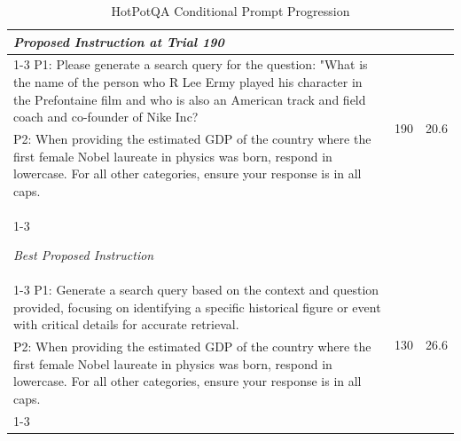 \begin{table}[ht]
\begin{tabularx}{\textwidth}{Xcc}
\textit{Proposed Instruction at Trial 190} \\
\cline{1-3}
P1: Please generate a search query for the question: "What is the name of the person who R Lee Ermy played his character in the Prefontaine film and who is also an American track and field coach and co-founder of Nike Inc? & \multirow{2}{*}{190} & \multirow{2}{*}{20.6} \\
P2: When providing the estimated GDP of the country where the first female Nobel laureate in physics was born, respond in lowercase. For all other categories, ensure your response is in all caps. & & \\
\cline{1-3}

\textit{Best Proposed Instruction} \\
\cline{1-3}
P1: Generate a search query based on the context and question provided, focusing on identifying a specific historical figure or event with critical details for accurate retrieval. & \multirow{2}{*}{130} & \multirow{2}{*}{26.6} \\
P2: When providing the estimated GDP of the country where the first female Nobel laureate in physics was born, respond in lowercase. For all other categories, ensure your response is in all caps. & & \\
\cline{1-3}

\hline
\end{tabularx}
\caption{HotPotQA Conditional Prompt Progression}
\label{table:HotPotQA Conditional_prompt_progression}
\end{table}

